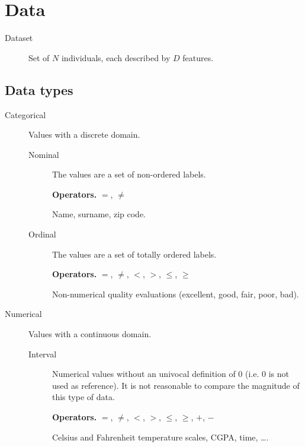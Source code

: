 \section{Data}

\begin{description}
    \item[Dataset] 
        Set of $N$ individuals, each described by $D$ features. 
\end{description}


\subsection{Data types}

\begin{description}
    \item[Categorical] Values with a discrete domain.
        \begin{description}
            \item[Nominal] 
                The values are a set of non-ordered labels.

                \textbf{Operators.} $=$, $\neq$
                \begin{example}
                    Name, surname, zip code.
                \end{example}

            \item[Ordinal] 
                The values are a set of totally ordered labels.

                \textbf{Operators.} $=$, $\neq$, $<$, $>$, $\leq$, $\geq$
                \begin{example}
                    Non-numerical quality evaluations (excellent, good, fair, poor, bad).
                \end{example}
        \end{description}

    \item[Numerical] Values with a continuous domain.
        \begin{description}
            \item[Interval] 
                Numerical values without an univocal definition of 0 (i.e. 0 is not used as reference).
                It is not reasonable to compare the magnitude of this type of data.

                \textbf{Operators.} $=$, $\neq$, $<$, $>$, $\leq$, $\geq$, $+$, $-$
                \begin{example}
                    Celsius and Fahrenheit temperature scales, CGPA, time, \dots.
                    

\end{example}
\end{description}
\end{description}
